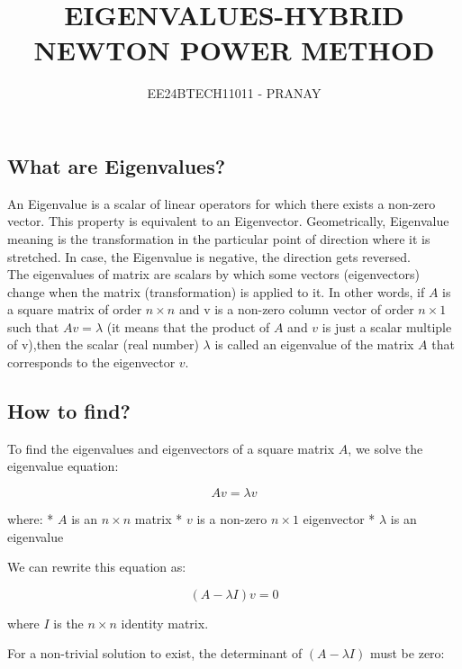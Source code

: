 \documentclass[journal,12pt,onecolumn]{IEEEtran}
\theoremstyle{remark}
\begin{document}

\vspace{3cm}

\title{EIGENVALUES-HYBRID NEWTON POWER METHOD}
\author{EE24BTECH11011 - PRANAY}
\maketitle

\bigskip

\renewcommand{\thefigure}{\theenumi}
\renewcommand{\thetable}{\theenumi}
\subsection{\textbf{What are Eigenvalues?}}
An Eigenvalue is a scalar of linear operators for which there exists a non-zero vector. This property is equivalent to an Eigenvector.
Geometrically, Eigenvalue meaning is the transformation in the particular point of direction where it is stretched. In case, the Eigenvalue is negative, the direction gets reversed.\\


The eigenvalues of matrix are scalars by which some vectors (eigenvectors) change when the matrix (transformation) is applied to it. In other words, if $A$ is a square matrix of order $n \times n$ and v is a non-zero column vector of order $n \times 1$ such that $Av = \lambda$ (it means that the product of $A$ and $v$ is just a scalar multiple of v),then the scalar (real number) $\lambda$ is called an eigenvalue of the matrix $A$ that corresponds to the eigenvector $v$.
\subsection{\textbf{How to find?}}

To find the eigenvalues and eigenvectors of a square matrix $A$, we solve the eigenvalue equation:

$$Av = \lambda v$$

where:
* $A$ is an $n \times n$ matrix
* $v$ is a non-zero $n \times 1$ eigenvector
* $\lambda$ is an eigenvalue

We can rewrite this equation as:

$$(A - \lambda I)v = 0$$

where $I$ is the $n \times n$ identity matrix.

For a non-trivial solution to exist, the determinant of $(A - \lambda I)$ must be zero:
\end{document}
